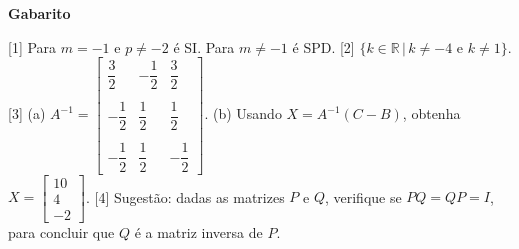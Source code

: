 \documentclass[12pt,a4paper]{article}
\begin{document}
\begin{center}
  \textbf{Gabarito}
\end{center}

[1] Para $m = -1$ e $p\neq -2$ é SI. Para $m\neq -1$ é SPD. 
[2] $\{k\in \mathbb{R}\,|\, k\neq -4\textrm{ e } k\neq 1\}$. 
[3] (a) $A^{-1} = \begin{bmatrix} 
 \dfrac{3}{2} & -\dfrac{1}{2} & \dfrac{3}{2} \\ \\
 -\dfrac{1}{2} & \dfrac{1}{2} & \dfrac{1}{2} \\ \\
 -\dfrac{1}{2} & \dfrac{1}{2} & -\dfrac{1}{2}
 \end{bmatrix}$. 
 (b) Usando $X = A^{-1}(C - B)$, obtenha 
 $X = \begin{bmatrix} 10 \\ 4 \\ -2\end{bmatrix}$. 
[4] Sugestão: dadas as matrizes $P$ e $Q$, verifique se $PQ = QP = I$, para 
concluir que $Q$ é a matriz inversa de $P$.
\end{document}
